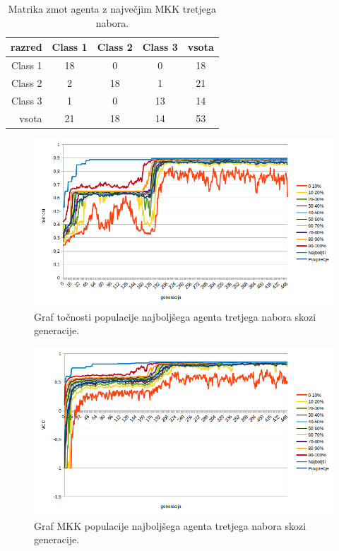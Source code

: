 \begin{table}[H]
    \centering
    \begin{tabular}{||rcccc||}
        \hline
        razred  & Class 1 & Class 2 & Class 3 & vsota \\ \hline
        Class 1 & 18      & 0       & 0       & 18    \\ \hline
        Class 2 & 2       & 18      & 1       & 21    \\ \hline
        Class 3 & 1       & 0       & 13      & 14    \\ \hline
        vsota   & 21      & 18      & 14      & 53    \\ \hline
    \end{tabular}
    \caption{Matrika zmot agenta z največjim MKK tretjega nabora.}
    \label{tab:wine_mcc_3}
\end{table}

\begin{figure}[H]
    \begin{center}
        \includegraphics[width=13cm]{wine/3/acc}
    \end{center}
    \caption{Graf točnosti populacije najboljšega agenta tretjega nabora skozi generacije.}
    \label{fig:wine_acc_3}
\end{figure}

\begin{figure}[H]
    \begin{center}
        \includegraphics[width=13cm]{wine/3/mcc}
    \end{center}
    \caption{Graf MKK populacije najboljšega agenta tretjega nabora skozi generacije.}
    \label{fig:wine_mcc_3}
\end{figure}

